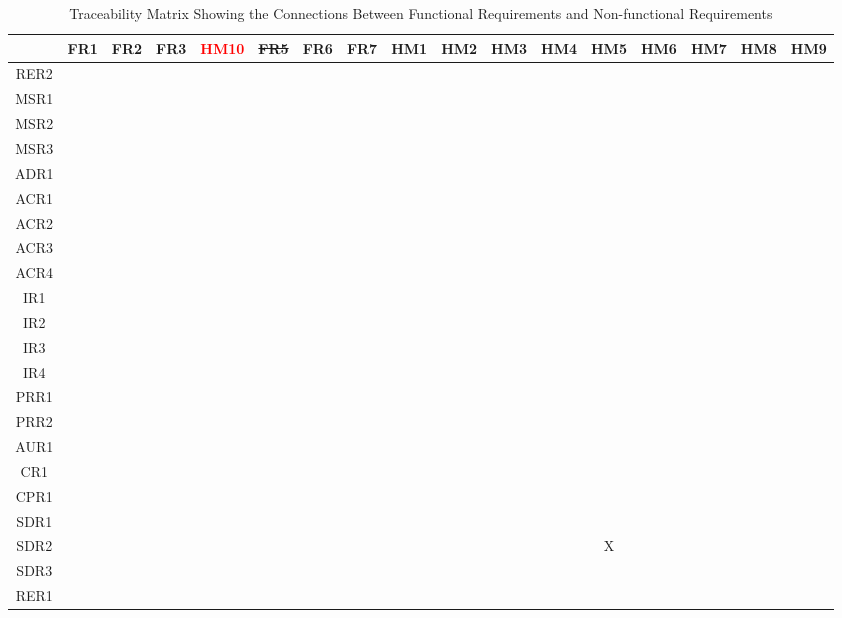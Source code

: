 \documentclass[12pt]{article}
\begin{document}
\begin{landscape}
\begin{table}[h!]
\centering
\begin{tabular}{|c|c|c|c|c|c|c|c|c|c|c|c|c|c|c|c|c|}
\hline
	& FR1 & FR2 & FR3 & \textcolor{red}{HM10} & \sout{FR5} & FR6 & FR7 & HM1 & HM2 & HM3 & HM4 & HM5 & HM6 & HM7 & HM8 & HM9 \\
\hline
RER2        & & & & & & & & & & & & & & & & \\ \hline
MSR1        & & & & & & & & & & & & & & & & \\ \hline
MSR2        & & & & & & & & & & & & & & & & \\ \hline
MSR3        & & & & & & & & & & & & & & & & \\ \hline
ADR1        & & & & & & & & & & & & & & & & \\ \hline
ACR1        & & & & & & & & & & & & & & & & \\ \hline
ACR2        & & & & & & & & & & & & & & & & \\ \hline
ACR3        & & & & & & & & & & & & & & & & \\ \hline
ACR4        & & & & & & & & & & & & & & & & \\ \hline
IR1         & & & & & & & & & & & & & & & & \\ \hline
IR2         & & & & & & & & & & & & & & & & \\ \hline
IR3         & & & & & & & & & & & & & & & & \\ \hline
IR4         & & & & & & & & & & & & & & & & \\ \hline
PRR1        & & & & & & & & & & & & & & & & \\ \hline
PRR2        & & & & & & & & & & & & & & & & \\ \hline
AUR1        & & & & & & & & & & & & & & & & \\ \hline
CR1         & & & & & & & & & & & & & & & & \\ \hline
CPR1        & & & & & & & & & & & & & & & & \\ \hline
SDR1        & & & & & & & & & & & & & & & & \\ \hline
SDR2        & & & & & & & & & & & & X & & & & \\ \hline
SDR3        & & & & & & & & & & & & & & & & \\ \hline
RER1        & & & & & & & & & & & & & & & & \\ \hline

\end{tabular}
\caption{Traceability Matrix Showing the Connections Between Functional Requirements and Non-functional Requirements}
\label{Table:A_trace}
\end{table}
\end{landscape}
\end{document}

